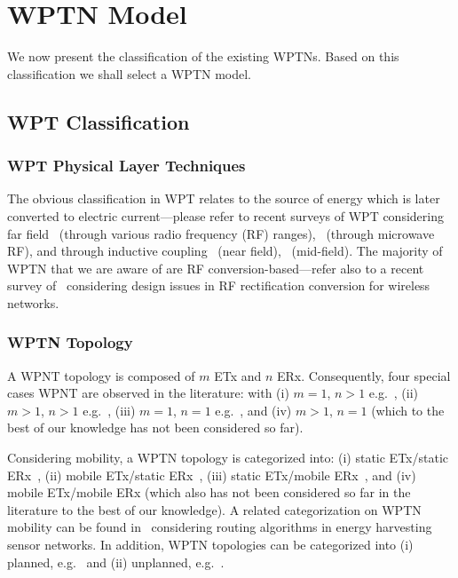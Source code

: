\documentclass[11pt,draftclsnofoot,journal,onecolumn]{IEEEtran}
\begin{document}
\section{WPTN Model}
\label{sec:wptn_model}

We now present the classification of the existing WPTNs. Based on this classification we shall select a WPTN model.

\subsection{WPT Classification}
\label{sec:wpt_classification}

\subsubsection{WPT Physical Layer Techniques}

The obvious classification in WPT relates to the source of energy which is later converted to electric current---please refer to recent surveys of WPT considering far field~\cite{visser_procieee_2013} (through various radio frequency (RF) ranges),~\cite{strassner_procieee_2013} (through microwave RF), and through inductive coupling~\cite{sample_procieee_2013} (near field),~\cite{ho_procieee_2013} (mid-field). The majority of WPTN that we are aware of are RF conversion-based---refer also to a recent survey of~\cite{lu_arxiv_2014,lu:2014:arxiv} considering design issues in RF rectification conversion for wireless networks.

\subsubsection{WPTN Topology}

A WPNT topology is composed of $m$ ETx and $n$ ERx. Consequently, four special cases WPNT are observed in the literature: with (i) $m=1$, $n>1$ e.g.~\cite{ju_twc_2014,zhao_tmc_2014}, (ii) $m>1$, $n>1$ e.g.~\cite{timotheou_twc_2014,naderi_twc_2014}, (iii) $m=1$, $n=1$ e.g.~\cite{liu_net_2014,yang_arxiv_2013}, and (iv) $m>1$, $n=1$ (which to the best of our knowledge has not been considered so far).

Considering mobility, a WPTN topology is categorized into: (i) static ETx/static ERx~\cite{liu_net_2014,naderi_twc_2014}, (ii) mobile ETx/static ERx~\cite{zhao_tmc_2014,wang_tmc_2014}, (iii) static ETx/mobile ERx~\cite{dai_tpds_2014,he_tmc_2013,mercier_jssc_2011}, and (iv) mobile ETx/mobile ERx (which also has not been considered so far in the literature to the best of our knowledge). A related categorization on WPTN mobility can be found in~\cite[Table IX]{lu_arxiv_2014} considering routing algorithms in energy harvesting sensor networks. In addition, WPTN topologies can be categorized into (i) planned, e.g.~\cite{timotheou_twc_2014,ju_twc_2014,zhao_tmc_2014,liu_net_2014} and (ii) unplanned, e.g.~\cite{krikidis_tcom_2013}.
\end{document}
